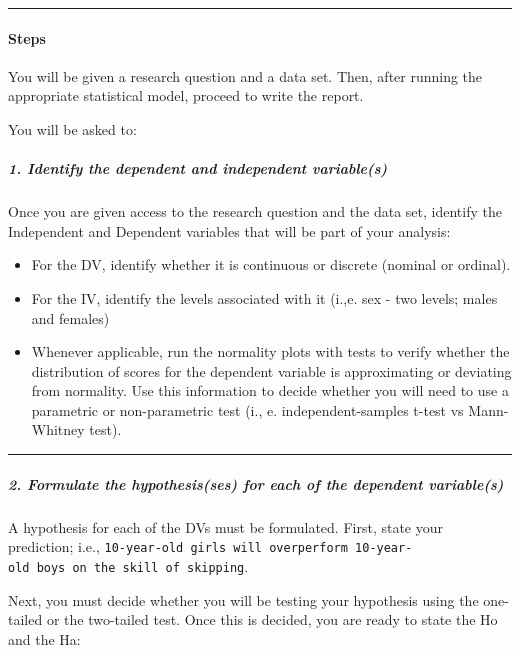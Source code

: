 \documentclass[11pt,]{article}
\begin{document}
\begin{center}\rule{0.5\linewidth}{0.5pt}\end{center}

\hypertarget{steps}{%
\paragraph{Steps}\label{steps}}

You will be given a research question and a data set. Then, after
running the appropriate statistical model, proceed to write the report.

You will be asked to:

\hypertarget{identify-the-dependent-and-independent-variables}{%
\subparagraph{1. Identify the dependent and independent
variable(s)}\label{identify-the-dependent-and-independent-variables}}

Once you are given access to the research question and the data set,
identify the Independent and Dependent variables that will be part of
your analysis:

\begin{itemize}
\item
  For the DV, identify whether it is continuous or discrete (nominal or
  ordinal).
\item
  For the IV, identify the levels associated with it (i.,e. sex - two
  levels; males and females)
\item
  Whenever applicable, run the normality plots with tests to verify
  whether the distribution of scores for the dependent variable is
  approximating or deviating from normality. Use this information to
  decide whether you will need to use a parametric or non-parametric
  test (i., e. independent-samples t-test vs Mann-Whitney test).
\end{itemize}

\begin{center}\rule{0.5\linewidth}{0.5pt}\end{center}

\hypertarget{formulate-the-hypothesisses-for-each-of-the-dependent-variables}{%
\subparagraph{2. Formulate the hypothesis(ses) for each of the dependent
variable(s)}\label{formulate-the-hypothesisses-for-each-of-the-dependent-variables}}

A hypothesis for each of the DVs must be formulated. First, state your
prediction; i.e.,
\texttt{10-year-old\ girls\ will\ overperform\ 10-year-old\ boys\ on\ the\ skill\ of\ skipping}.

Next, you must decide whether you will be testing your hypothesis using
the one-tailed or the two-tailed test. Once this is decided, you are
ready to state the Ho and the Ha:
\end{document}
